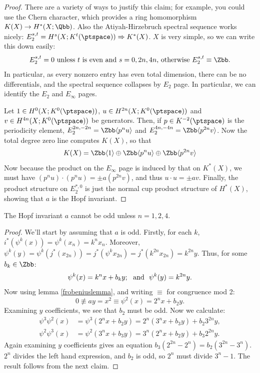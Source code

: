 \begin{proof}
There are a variety of ways to justify this claim; for example, you could use the Chern character, which provides a ring homomorphism $K(X) \to H^*(X; \Qbb)$.  Also the Atiyah-Hirzebruch spectral sequence works nicely: $E_2^{s, t} = H^s(X; K^t(\ptspace)) \Rightarrow K^*(X)$.  $X$ is very simple, so we can write this down easily:
\[E_2^{s,t}=0\text{ unless $t$ is even and $s=0,2n,4n$, otherwise $E_2^{s,t}\equiv\Zbb$.}\]
In particular, as every nonzero entry has even total dimension, there can be no differentials, and the spectral sequence collapses by $E_2$ page. In particular, we can identify the $E_2$ and $E_\infty$ pages.

Let $1\in H^{0}(X;K^0(\ptspace))$, $u\in H^{2n}(X;K^0(\ptspace))$ and $v\in H^{4n}(X;K^0(\ptspace))$ be generators. Then, if $p\in K^{-2}(\ptspace)$ is the periodicity element, $E_2^{2n,-2n}=\Zbb\langle p^nu\rangle$ and $E_2^{4n,-4n}=\Zbb\langle p^{2n}v\rangle$.
Now the total degree zero line computes $K(X)$, so that
\[K(X)=
\Zbb\langle1\rangle\oplus
\Zbb\langle p^nu\rangle\oplus
\Zbb\langle p^{2n}v\rangle\]
Now because the product on the $E_\infty$ page is induced by that on $K^*(X)$, we must have $(p^nu)\cdot(p^nu)=\pm a(p^{2n}v)$, and thus $u\cdot u=\pm av$. Finally, the product structure on $E_2^{*,0}$ is just the normal cup product structure of $H^*(X)$, showing that $a$ is the Hopf invariant.
%
\end{proof}
\begin{thm}
The Hopf invariant $a$ cannot be odd unless $n = 1, 2, 4$.
\end{thm}
\begin{proof}
We'll start by assuming that $a$ is odd.
Firstly, for each $k$, $i^*(\psi^k(x))=\psi^k(x_n)=k^nx_n$. Moreover, $\psi^k(y)=\psi^k(j^*(x_{2n}))=j^*(\psi^kx_{2n})
=j^*(k^{2n}x_{2n})=k^{2n}y$. Thus, for some $b_k\in\Zbb$:
\[\psi^k(x)=k^nx+b_ky;\textup{ \ and \ }\psi^k(y)=k^{2n}y.\]
Now using lemma \ref{frobeniuslemma}, and writing $\equiv$ for congruence mod 2:
\[0\not\equiv ay=x^2\equiv\psi^2(x)=2^nx+b_2y.\]
Examining $y$ coefficients, we see that $b_2$ must be odd. Now we calculate:
\begin{align*}
\psi^3 \psi^2(x) & = \psi^3(2^n x + b_2 y) = 2^n(3^n x + b_3 y) + b_2 3^{2n} y, \\
\psi^2 \psi^3(x) & = \psi^2(3^n x + b_3 y) = 3^n(2^n x + b_2 y) + b_3 2^{2n} y.
\end{align*}
Again examining $y$ coefficients gives an equation $b_3(2^{2n} - 2^n) = b_2(3^{2n} - 3^n)$.  $2^n$ divides the left hand expression, and $b_2$ is odd, so $2^n$ must divide $3^n - 1$. The result follows from the next claim.
\end{proof}
